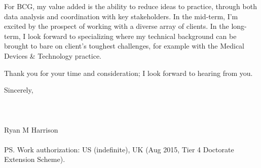\documentclass[a4paper]{../res}
\begin{document}
\begin{sloppypar}
\begin{resume}
For BCG, my value added is the ability to reduce ideas to practice, through both data analysis and coordination with key stakeholders. In the mid-term, I'm excited by the prospect of working with a diverse array of clients. In the long-term, I look forward to specializing where my technical background can be brought to bare on client's toughest challenges, for example with the Medical Devices \& Technology practice.

Thank you for your time and consideration; I look forward to hearing from you.

Sincerely,
\\ \\ \\ \\
Ryan M Harrison \\ \\
PS. Work authorization: US (indefinite), UK (Aug 2015, Tier 4 Doctorate Extension Scheme).

\end{resume} 
\end{sloppypar}
\end{document}
